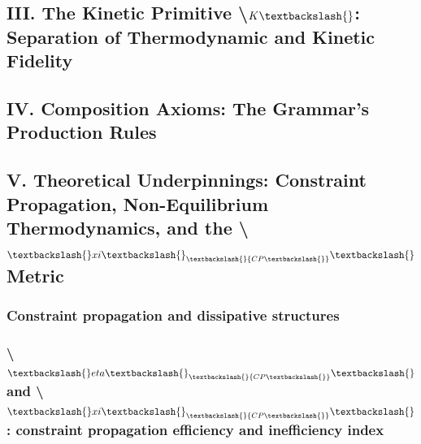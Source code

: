 \documentclass{article[11pt,letterpaper]}
\begin{document}
\subsection{III. The Kinetic Primitive \textbackslash{}$K\textbackslash{}$: Separation of Thermodynamic and Kinetic Fidelity}
\label{sec:iii-the-kinetic-primitive-k-separation-of-thermody}


\subsection{IV. Composition Axioms: The Grammar's Production Rules}
\label{sec:iv-composition-axioms-the-grammars-production-rule}


\subsection{V. Theoretical Underpinnings: Constraint Propagation, Non-Equilibrium Thermodynamics, and the \textbackslash{}$\textbackslash{}xi\textbackslash{}_\textbackslash{}{CP\textbackslash{}}\textbackslash{}$ Metric}
\label{sec:v-theoretical-underpinnings-constraint-propagation}


\subsubsection{Constraint propagation and dissipative structures}
\label{sec:constraint-propagation-and-dissipative-structures}


\subsubsection{\textbackslash{}$\textbackslash{}eta\textbackslash{}_\textbackslash{}{CP\textbackslash{}}\textbackslash{}$ and \textbackslash{}$\textbackslash{}xi\textbackslash{}_\textbackslash{}{CP\textbackslash{}}\textbackslash{}$: constraint propagation efficiency and inefficiency index}
\label{sec:etacp-and-xicp-constraint-propagation-efficiency-a}
\end{document}
